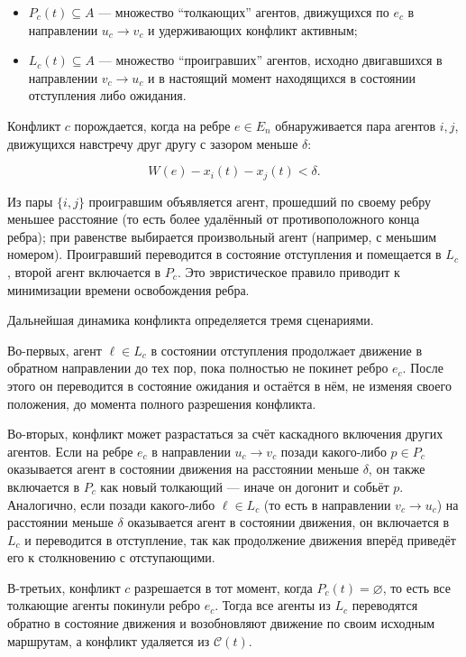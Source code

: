 \begin{itemize}
    \item $P_c(t) \subseteq A$ --- множество \enquote{толкающих} агентов, движущихся по $e_c$ в
        направлении $u_c \to v_c$ и удерживающих конфликт активным;
    \item $L_c(t) \subseteq A$ --- множество \enquote{проигравших} агентов, исходно двигавшихся
        в направлении $v_c \to u_c$ и в настоящий момент находящихся в состоянии
        отступления либо ожидания.
\end{itemize}

Конфликт $c$ порождается, когда на ребре $e \in E_{n}$ обнаруживается пара агентов $i, j$,
движущихся навстречу друг другу с зазором меньше $\delta$:

\begin{equation}
    W(e) - x_i(t) - x_j(t) < \delta.
\label{e:reverse-trigger}
\end{equation}

Из пары $\{i, j\}$ проигравшим объявляется агент, прошедший по своему ребру меньшее
расстояние (то есть более удалённый от противоположного конца ребра); при равенстве выбирается
произвольный агент (например, с меньшим номером). Проигравший переводится в состояние
отступления и помещается в $L_c$, второй агент включается в $P_c$. Это эвристическое правило
приводит к минимизации времени освобождения ребра.

Дальнейшая динамика конфликта определяется тремя сценариями.

Во-первых, агент $\ell \in L_c$ в состоянии отступления продолжает движение в обратном
направлении до тех пор, пока полностью не покинет ребро $e_c$. После этого он переводится в
состояние ожидания и остаётся в нём, не изменяя своего положения, до момента полного
разрешения конфликта.

Во-вторых, конфликт может разрастаться за счёт каскадного включения других агентов. Если на ребре
$e_c$ в направлении $u_c \to v_c$ позади какого-либо $p \in P_c$ оказывается агент в состоянии
движения на расстоянии меньше $\delta$, он также включается в $P_c$ как новый толкающий
--- иначе он догонит и собьёт $p$. Аналогично, если позади какого-либо $\ell \in L_c$ (то есть в
направлении $v_c \to u_c$) на расстоянии меньше $\delta$ оказывается агент в состоянии
движения, он включается в $L_c$ и переводится в отступление, так как продолжение
движения вперёд приведёт его к столкновению с отступающими.

В-третьих, конфликт $c$ разрешается в тот момент, когда $P_c(t) = \varnothing$, то есть все
толкающие агенты покинули ребро $e_c$. Тогда все агенты из $L_c$ переводятся обратно в состояние
движения и возобновляют движение по своим исходным маршрутам, а конфликт удаляется из
$\mathcal{C}(t)$.

